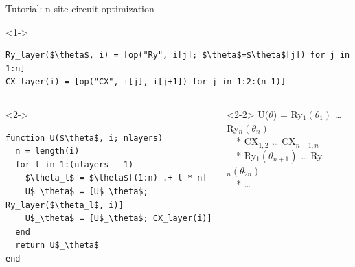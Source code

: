 \begin{frame}[fragile]{Tutorial: n-site circuit optimization}

\begin{onlyenv}<1->
\begin{lstlisting}[language=JuliaLocal, style=julia, mathescape, basicstyle=\scriptsize\ttfamily]
Ry_layer($\theta$, i) = [op("Ry", i[j]; $\theta$=$\theta$[j]) for j in 1:n]
CX_layer(i) = [op("CX", i[j], i[j+1]) for j in 1:2:(n-1)]
\end{lstlisting}
\end{onlyenv}

\begin{columns}

\begin{column}{5cm}

\begin{onlyenv}<2->
\begin{lstlisting}[language=JuliaLocal, style=julia, mathescape, basicstyle=\scriptsize\ttfamily]
function U($\theta$, i; nlayers)
  n = length(i)
  for l in 1:(nlayers - 1)
    $\theta_l$ = $\theta$[(1:n) .+ l * n]
    U$_\theta$ = [U$_\theta$; Ry_layer($\theta_l$, i)]
    U$_\theta$ = [U$_\theta$; CX_layer(i)]
  end
  return U$_\theta$
end
\end{lstlisting}
\end{onlyenv}

\end{column}

\begin{column}{5.5cm}

\begin{onlyenv}<2-2>
U($\theta$) = Ry$_1(\theta_1)$ … Ry$_n(\theta_n)$ \\
\ \ *           CX$_{1,2}$ … CX$_{n-1,n}$ \\
\ \ *          Ry$_1(\theta_{n+1})$ … Ry$_n(\theta_{2n})$ \\
\ \ *           …
~\\
~\\
~\\
~\\
~\\
~\\
\end{onlyenv}


\end{column}
\end{columns}
\end{frame}

